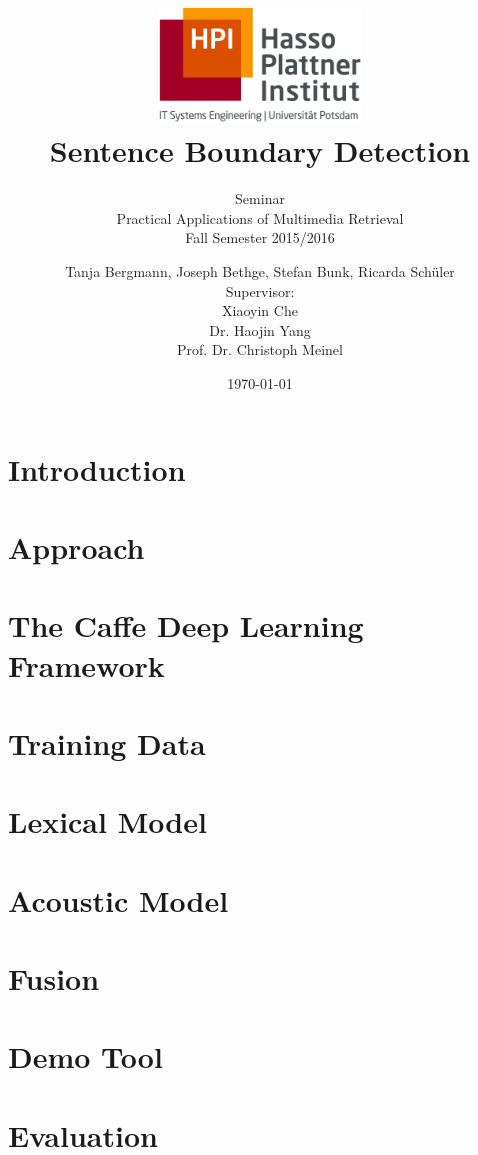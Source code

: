 \documentclass[a4paper,12pt,pagesize,headsepline,bibliography=totoc,titlepage]{scrartcl}
\title{
	\includegraphics*[width=0.4\textwidth]{img/hpi_logo.png}\\
	\vspace{24pt}
	Sentence Boundary Detection
}
\subtitle{
	Seminar\\
	Practical Applications of Multimedia Retrieval\\
	Fall Semester 2015/2016
}
\author{
	Tanja Bergmann, Joseph Bethge, Stefan Bunk, Ricarda Schüler\\[12pt]
	Supervisor:\\
    Xiaoyin Che\\
	Dr. Haojin Yang\\
	Prof. Dr. Christoph Meinel
}
\date{\today}
\begin{document}
\maketitle
\tableofcontents
\newpage

\section{Introduction}
\label{sec:introduction}


\section{Approach}
\label{sec:approach}


\section{The Caffe Deep Learning Framework}
\label{sec:caffe}


\section{Training Data}
\label{sec:training_data}


\section{Lexical Model}
\label{sec:lexical_model}


\section{Acoustic Model}
\label{sec:acoustic_model}


\section{Fusion}
\label{sec:fusion}


\section{Demo Tool}
\label{sec:demo}


\section{Evaluation}
\label{sec:evaluation}

\end{document}
